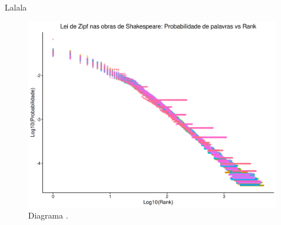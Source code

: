\documentclass{tufte-book}
\begin{document}
Lalala
\begin{figure}[htbp]
    \centering
    \includegraphics[width=\linewidth]{figures/zipf_plot.png}
    \caption{Diagrama \cite{shannon1948}.}
    \label{fig:shannon-communication-system}
\end{figure}
\end{document}
